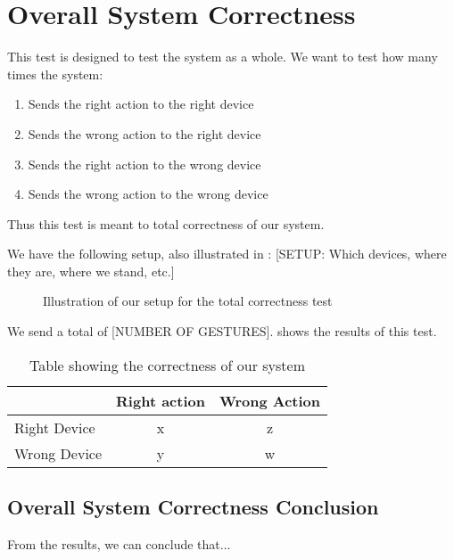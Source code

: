 \section{Overall System Correctness}
This test is designed to test the system as a whole. 
We want to test how many times the system:
\begin{enumerate}
    \item Sends the right action to the right device
    \item Sends the wrong action to the right device
    \item Sends the right action to the wrong device
    \item Sends the wrong action to the wrong device
\end{enumerate}
Thus this test is meant to total correctness of our system. 

We have the following setup, also illustrated in :
[SETUP: Which devices, where they are, where we stand, etc.]
\begin{figure}[!htb]
    \centering
    \caption{Illustration of our setup for the total correctness test}
    \label{fig:totalcorrectness}
\end{figure}

We send a total of [NUMBER OF GESTURES]. 
 shows the results of this test.

\begin{table}
    \centering
    \begin{tabular}{l|cc}
                     & Right action & Wrong Action \\ \hline
        Right Device &      x       &     z        \\
        Wrong Device &      y       &     w        \\
    \end{tabular} 
    
    \caption{Table showing the correctness of our system}
    \label{table:correctnessresults}
\end{table}

\subsection{Overall System Correctness Conclusion}
From the results, we can conclude that... 
